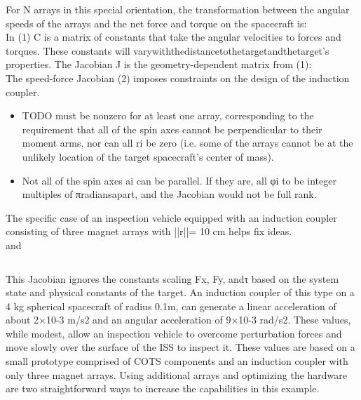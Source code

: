 For N arrays in this special orientation, the transformation between the angular speeds of the arrays and the net force and torque on the spacecraft is:
\begin{equation}\label{eq:forces}
\end{equation}
In (1) C is a matrix of constants that take the angular velocities to forces and torques. These constants will vary‎with‎the‎distance‎to‎the‎target‎and‎the‎target’s‎ properties.
The Jacobian J is the geometry-dependent matrix from (1):
\begin{equation}\label{eq:genJacobian}
\end{equation}
The speed-force Jacobian (2) imposes constraints on the design of the induction coupler.

\begin{itemize}
\item  TODO must be nonzero for at least one array, corresponding to the requirement that all of the spin axes cannot be perpendicular to their moment arms, nor can all ri be zero (i.e. some of the arrays cannot be at the unlikely location of the target spacecraft's center of mass).
\item  Not all of the spin axes ai can be parallel. If they are, all φi to be integer multiples of π‎radians‎apart, and the Jacobian would not be full rank.
\end{itemize}

The specific case of an inspection vehicle equipped with an induction coupler consisting of three magnet arrays with ||r||= 10 cm helps fix ideas.
\begin{equation}\label{eq:specificPhi}
\end{equation}
and
\begin{equation}\label{eq:specificR}
\end{equation}

\begin{equation}\label{eq:specificJac}
\end{equation}

This Jacobian ignores the constants scaling Fx, Fy, and‎τ‎ based on the system state and physical constants of the target.
An induction coupler of this type on a 4 kg spherical spacecraft of radius 0.1m, can generate a linear acceleration of about 2×10-3 m/s2 and an angular acceleration of 9×10-3 rad/s2. These values, while modest, allow an inspection vehicle to overcome perturbation forces and move slowly over the surface of the ISS to inspect it. These values are based on a small prototype comprised of COTS components and an induction coupler with only three magnet arrays. Using additional arrays and optimizing the hardware are two straightforward ways to increase the capabilities in this example.